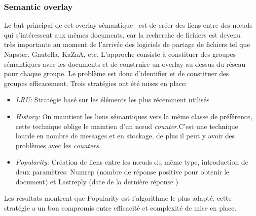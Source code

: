 		\subsubsection{Semantic overlay}
			Le but principal de cet overlay sémantique~\cite{999375} est de créer des liens entre des nœuds qui s'intéressent aux mêmes documents, car la recherche de fichiers est devenu très importante au moment de l'arrivée des logiciels de partage de fichiers tel que Napster, Gnutella, KaZaA, etc. L'approche consiste à constituer des groupes sémantiques avec les documents et de construire un overlay au dessus du réseau pour chaque groupe. Le problème est donc d'identifier et de constituer des groupes efficacement. Trois stratégies ont été mises en place:
		\begin{itemize}
		\renewcommand{\labelitemi}{$\bullet$}
                	\item \textit{LRU:} Stratégie basé sur les éléments les plus récemment utilisés
                	\item \textit{History:} On maintient les liens sémantiques vers la même classe de préférence, cette technique oblige le maintien d'un nœud \textit{counter}.C'est une technique lourde en nombre de messages et en stockage, de plus il peut y avoir des problèmes avec les \textit{counters}.
	                \item \textit{Popularity:} Création de liens entre les nœuds du même type, introduction de deux paramètres: Numrep (nombre de réponse positive pour obtenir le document) et Lastreply (date de la dernière réponse )
        	\end{itemize}
	        Les résultats montrent que Popularity est l'algorithme le plus adapté, cette stratégie a un bon compromis entre efficacité et complexité de mise en place.

